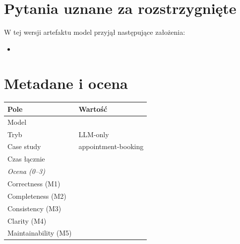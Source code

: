 \documentclass[12pt,a4paper]{article}
\begin{document}
\section{Pytania uznane za rozstrzygnięte}
W tej wersji artefaktu model przyjął następujące założenia:
\begin{itemize}
    \item 
\end{itemize}

\newpage   
\section{Metadane i ocena}

\begin{table}[h]
\begin{tabular}{ll}
\toprule
\textbf{Pole} & \textbf{Wartość} \\
\midrule
Model & \texttt{} \\
Tryb & LLM-only \\
Case study & appointment-booking \\
Czas łącznie &  \\
\midrule
\textit{Ocena (0--3)} & \\
\midrule
Correctness (M1) & \\
Completeness (M2) & \\
Consistency (M3) & \\
Clarity (M4) & \\
Maintainability (M5) & \\
\bottomrule
\end{tabular}
\end{table}
\end{document}
